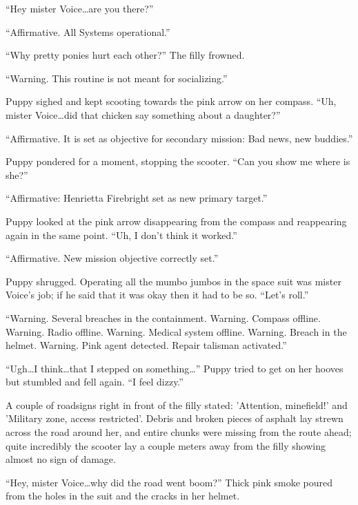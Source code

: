 ``Hey mister Voice\dots are you there?''

``{\mt Affirmative. All Systems operational.}''

``Why pretty ponies hurt each other?'' The filly frowned.

``{\mt Warning. This routine is not meant for socializing.}''

Puppy sighed and kept scooting towards the pink arrow on her compass. ``Uh, mister Voice\dots did that chicken say something about a daughter?''

``{\mt Affirmative. It is set as objective for secondary mission: Bad news, new buddies.}''

Puppy pondered for a moment, stopping the scooter. ``Can you show me where is she?''

``{\mt Affirmative: Henrietta Firebright set as new primary target.}''

Puppy looked at the pink arrow disappearing from the compass and reappearing again in the same point. ``Uh, I don't think it worked.''

``{\mt Affirmative. New mission objective correctly set.}''

Puppy shrugged. Operating all the mumbo jumbos in the space suit was mister Voice's job; if he said that it was okay then it had to be so. ``Let's roll.''

\horizonline


``{\mt Warning. Several breaches in the containment. Warning. Compass offline. Warning. Radio offline. Warning. Medical system offline. Warning. Breach in the helmet. Warning. Pink agent detected. Repair talisman activated.}''

``Ugh\dots I think\dots that I stepped on something\dots'' Puppy tried to get on her hooves but stumbled and fell again. ``I feel dizzy.''

A couple of roadsigns right in front of the filly stated: 'Attention, minefield!' and 'Military zone, access restricted'. Debris and broken pieces of asphalt lay strewn across the road around her, and entire chunks were missing from the route ahead; quite incredibly the scooter lay a couple meters away from the filly showing almost no sign of damage.

``Hey, mister Voice\dots why did the road went boom?'' Thick pink smoke poured from the holes in the suit and the cracks in her helmet.

